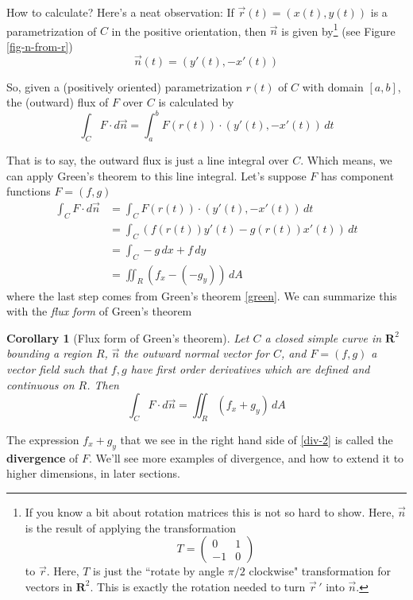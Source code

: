 \documentclass[12pt]{article}
\numberwithin{equation}{subsection}
\numberwithin{figure}{subsection}
\newtheorem{corr}[subsection]{Corollary}
\theoremstyle{note}
\begin{document}
{How to calculate? Here's a neat observation: If $\vec{r}(t)=(x(t),y(t))$ is a parametrization of $C$ in the positive orientation, then $\vec{n}$ is given by\footnote{If you know a bit about rotation matrices this is not so hard to show. Here, $\vec{n}$ is the result of applying the transformation \[T=\begin{pmatrix} 0 & 1 \\ -1 & 0\end{pmatrix}\] to $\vec{r}$. Here, $T$ is just the ``rotate by angle $\pi/2$ clockwise" transformation for vectors in $\mathbf{R}^2$. This is exactly the rotation needed to turn $\vec{r}\,'$ into $\vec{n}$.} (see Figure \ref{fig-n-from-r}) \begin{equation} \vec{n}(t)=(y'(t),-x'(t))\end{equation}


So, given a (positively oriented) parametrization $r(t)$ of $C$ with domain $[a,b]$, the (outward) flux of $F$ over $C$ is calculated by \begin{equation} \int_C F\cdot d\vec{n} = \int_a^b F(r(t))\cdot (y'(t),-x'(t))\,dt\end{equation}

That is to say, the outward flux is just a line integral over $C$. Which means, we can apply Green's theorem to this line integral. Let's suppose $F$ has component functions $F=(f,g)$
\begin{align*}
	\int_C F\cdot d\vec{n} & = \int_C F(r(t))\cdot (y'(t),-x'(t))\,dt \\
	& = \int_C \left( f(r(t)) y'(t) - g(r(t))x'(t) \right) \,dt\\
	& =\int_C  -g\,dx+f\,dy \\
	& = \iint_R (f_x-(-g_y))\,dA 
\end{align*}
where the last step comes from Green's theorem \eqref{green}. We can summarize this with the \textit{flux form} of Green's theorem

\begin{corr}[Flux form of Green's theorem]\label{green-flux}
Let $C$ a closed simple curve in $\mathbf{R}^2$ bounding a region $R$, $\vec{n}$ the outward normal vector for $C$, and  $F=(f,g)$ a vector field such that $f,g$ have first order derivatives which are defined and continuous on $R$. Then \begin{equation} \label{div-2} \int_{C} F\cdot d\vec{n} = \iint_R (f_x+g_y) \,dA\end{equation} 
\end{corr}
The expression $f_x+g_y$ that we see in the right hand side of \eqref{div-2} is called the \textbf{divergence} of $F$. We'll see more examples of divergence, and how to extend it to higher dimensions, in later sections. 


}
\end{document}
